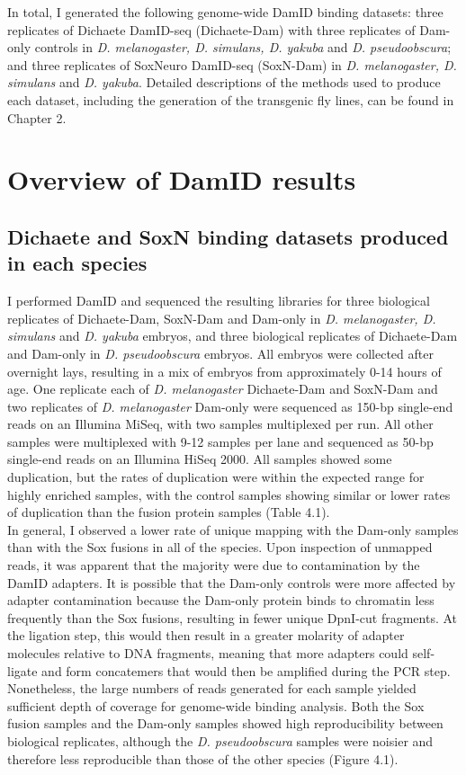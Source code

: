 In total, I generated the following genome-wide DamID binding datasets: three replicates of Dichaete DamID-seq (Dichaete-Dam) with three replicates of Dam-only controls in \emph{D. melanogaster, D. simulans, D. yakuba} and \emph{D. pseudoobscura}; and three replicates of SoxNeuro DamID-seq (SoxN-Dam) in \emph{D. melanogaster, D. simulans} and \emph{D. yakuba}. Detailed descriptions of the methods used to produce each dataset, including the generation of the transgenic fly lines, can be found in Chapter 2.

\section{Overview of DamID results}
\subsection{Dichaete and SoxN binding datasets produced in each species}
I performed DamID and sequenced the resulting libraries for three biological replicates of Dichaete-Dam, SoxN-Dam and Dam-only in \emph{D. melanogaster, D. simulans} and \emph{D. yakuba} embryos, and three biological replicates of Dichaete-Dam and Dam-only in \emph{D. pseudoobscura} embryos. All embryos were collected after overnight lays, resulting in a mix of embryos from approximately 0-14 hours of age. One replicate each of \emph{D. melanogaster} Dichaete-Dam and SoxN-Dam and two replicates of \emph{D. melanogaster} Dam-only were sequenced as 150-bp single-end reads on an Illumina MiSeq, with two samples multiplexed per run. All other samples were multiplexed with 9-12 samples per lane and sequenced as 50-bp single-end reads on an Illumina HiSeq 2000. All samples showed some duplication, but the rates of duplication were within the expected range for highly enriched samples, with the control samples showing similar or lower rates of duplication than the fusion protein samples (Table 4.1).\\

In general, I observed a lower rate of unique mapping with the Dam-only samples than with the Sox fusions in all of the species. Upon inspection of unmapped reads, it was apparent that the majority were due to contamination by the DamID adapters. It is possible that the Dam-only controls were more affected by adapter contamination because the Dam-only protein binds to chromatin less frequently than the Sox fusions, resulting in fewer unique DpnI-cut fragments. At the ligation step, this would then result in a greater molarity of adapter molecules relative to DNA fragments, meaning that more adapters could self-ligate and form concatemers that would then be amplified during the PCR step. Nonetheless, the large numbers of reads generated for each sample yielded sufficient depth of coverage for genome-wide binding analysis. Both the Sox fusion samples and the Dam-only samples showed high reproducibility between biological replicates, although the \emph{D. pseudoobscura} samples were noisier and therefore less reproducible than those of the other species (Figure 4.1).\\ 

